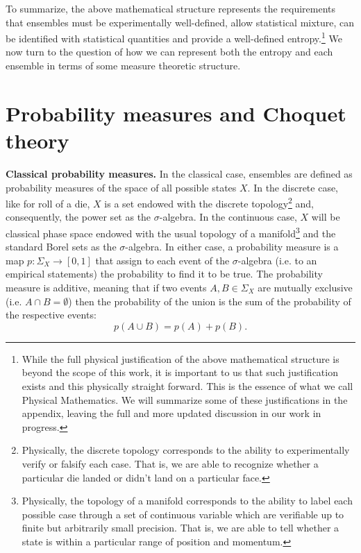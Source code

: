 \documentclass[10pt,twocolumn, nofootinbib]{revtex4-2}
\begin{document}
To summarize, the above mathematical structure represents the requirements that ensembles must be experimentally well-defined, allow statistical mixture, can be identified with statistical quantities and provide a well-defined entropy.\footnote{While the full physical justification of the above mathematical structure is beyond the scope of this work, it is important to us that such justification exists and this physically straight forward. This is the essence of what we call Physical Mathematics. We will summarize some of these justifications in the appendix, leaving the full and more updated discussion in our work in progress.} We now turn to the question of how we can represent both the entropy and each ensemble in terms of some measure theoretic structure.

\section{Probability measures and Choquet theory}

\textbf{Classical probability measures.} In the classical case, ensembles are defined as probability measures of the space of all possible states $X$. In the discrete case, like for roll of a die, $X$ is a set endowed with the discrete topology\footnote{Physically, the discrete topology corresponds to the ability to experimentally verify or falsify each case. That is, we are able to recognize whether a particular die landed or didn't land on a particular face.} and, consequently, the power set as the $\sigma$-algebra. In the continuous case, $X$ will be classical phase space endowed with the usual topology of a manifold\footnote{Physically, the topology of a manifold corresponds to the ability to label each possible case through a set of continuous variable which are verifiable up to finite but arbitrarily small precision. That is, we are able to tell whether a state is within a particular range of position and momentum.} and the standard Borel sets as the $\sigma$-algebra. In either case, a probability measure is a map $p : \Sigma_X \to [0,1]$ that assign to each event of the $\sigma$-algebra (i.e. to an empirical statements) the probability to find it to be true. The probability measure is additive, meaning that if two events $A, B \in \Sigma_X$ are mutually exclusive (i.e. $A \cap B = \emptyset$) then the probability of the union is the sum of the probability of the respective events:
\begin{equation}
	p(A\cup B) = p(A) + p(B).
\end{equation}
\end{document}
